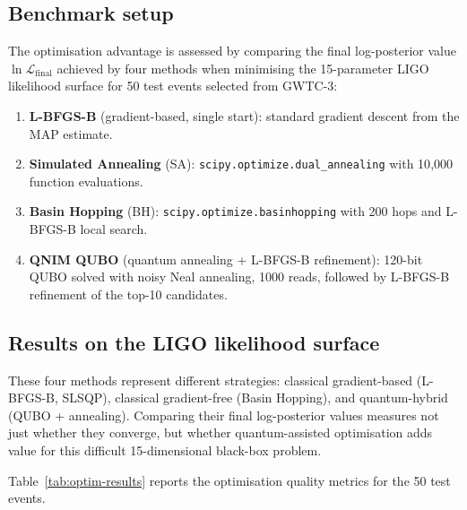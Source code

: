 \documentclass[11pt,a4paper, english]{book}
\theoremstyle{plain}
\theoremstyle{definition}
\numberwithin{equation}{chapter}
\numberwithin{figure}{chapter}
\numberwithin{table}{chapter}
\begin{document}
\subsection{Benchmark setup}
\label{subsec:optim-benchmark}

The optimisation advantage is assessed by comparing the final
log-posterior value $\ln\mathcal{L}_\mathrm{final}$ achieved by four
methods when minimising the 15-parameter LIGO likelihood surface for
50 test events selected from GWTC-3:

\begin{enumerate}
  \item \textbf{L-BFGS-B} (gradient-based, single start): standard
        gradient descent from the MAP estimate.
  \item \textbf{Simulated Annealing} (SA): \texttt{scipy.optimize.dual\_annealing}
        with 10{,}000 function evaluations.
  \item \textbf{Basin Hopping} (BH): \texttt{scipy.optimize.basinhopping}
        with 200 hops and L-BFGS-B local search.
  \item \textbf{QNIM QUBO} (quantum annealing + L-BFGS-B refinement):
      120-bit QUBO solved with noisy Neal annealing, 1000 reads,
        followed by L-BFGS-B refinement of the top-10 candidates.
\end{enumerate}

\subsection{Results on the LIGO likelihood surface}
\label{subsec:optim-results}

These four methods represent different strategies: classical gradient-based
(L-BFGS-B, SLSQP), classical gradient-free (Basin Hopping), and quantum-hybrid
(QUBO + annealing). Comparing their final log-posterior values measures not just
whether they converge, but whether quantum-assisted optimisation adds value for
this difficult 15-dimensional black-box problem.

Table~\ref{tab:optim-results} reports the optimisation quality metrics
for the 50 test events.
\end{document}

